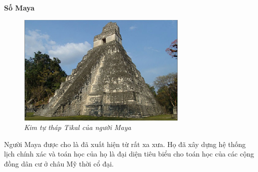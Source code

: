 	\vskip 0.1cm
	\textbf{Số Maya}
	\vskip 0.1cm
	\begin{figure}
		\centering
		\vspace*{-10pt}
		\captionsetup{labelformat= empty, justification=centering}
		\includegraphics[width=1\linewidth]{28}
		\caption{\textit{\color{toancuabi}Kim tự tháp Tikal của người Maya}}
		\vspace*{-15pt}
	\end{figure}
	Người Maya  được cho là đã xuất hiện từ rất xa xưa. Họ đã xây dựng hệ thống lịch chính xác và toán học của họ là đại diện tiêu biểu cho toán học của các cộng đồng dân cư ở châu Mỹ thời cổ đại.
	
